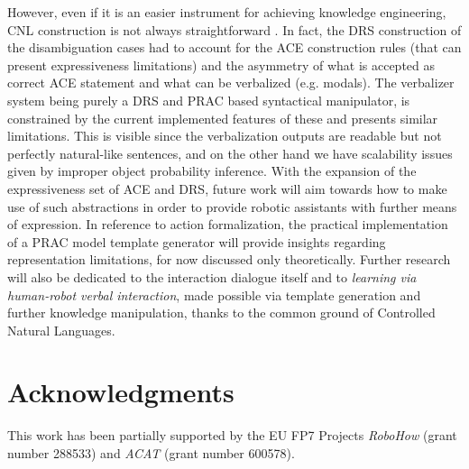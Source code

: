 \documentclass[oribibl]{llncs}
\begin{document}
However, even if it is an easier instrument for achieving knowledge 
engineering, CNL construction is not always straightforward \cite
{Schwitter05alayered}. In fact, the DRS construction of the 
disambiguation cases had to account for the ACE construction rules 
(that can present expressiveness limitations) and the asymmetry of 
what is accepted as correct ACE statement and what can be verbalized 
(e.g. modals). The verbalizer system being purely a DRS and PRAC 
based syntactical manipulator, is constrained by the current 
implemented features of these and presents similar limitations. This 
is visible since the verbalization outputs are readable but not 
perfectly natural-like sentences, and on the other hand we have 
scalability issues given by improper object probability inference. 
With the expansion of the expressiveness set of ACE and DRS, 
future work will aim towards how 
to make use of such abstractions in order to provide robotic 
assistants with further means of expression. 
In reference to action formalization, the practical implementation 
of a PRAC model template generator will provide insights regarding
 representation limitations, for now discussed only theoretically. 
Further research will 
also be dedicated to the interaction dialogue itself and to \textit
{learning via human-robot verbal interaction}, made possible via 
template generation and further knowledge manipulation, thanks to 
the common ground of Controlled Natural Languages.

\section{Acknowledgments}
This work has been partially supported by the EU FP7 Projects
\emph{RoboHow} (grant number 288533) and \emph{ACAT} (grant number 600578).

%
{}

%
\end{document}
